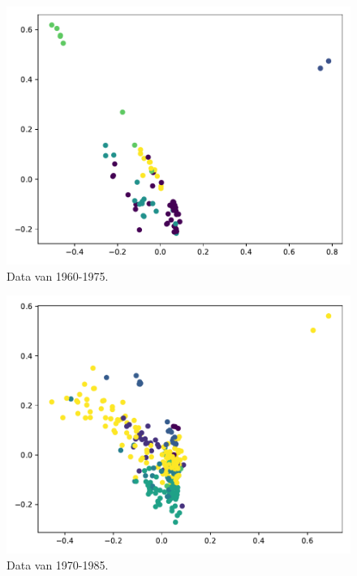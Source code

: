 \documentclass[a4paper,fontsize=11pt]{article}
\begin{document}
\begin{figure}[H]
  \centering
  \includegraphics[width=\textwidth]{pca_1960-1975.pdf}
  \caption{Data van 1960-1975.}
  \label{fig:1960}
\end{figure}

\begin{figure}[H]
  \centering
  \includegraphics[width=\textwidth]{pca_1970-1985.pdf}
  \caption{Data van 1970-1985.}
  \label{fig:1970}
\end{figure}
\end{document}
